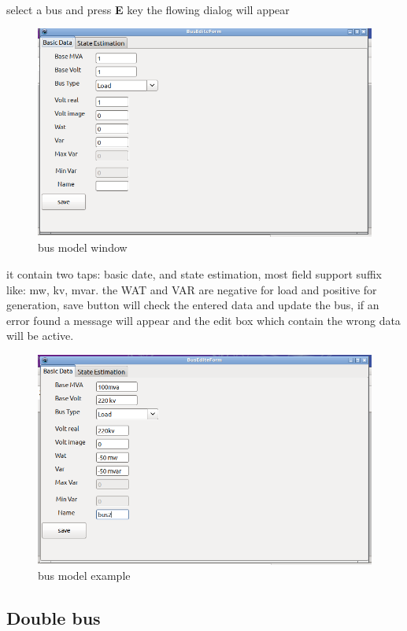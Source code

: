 \documentclass{article}
\begin{document}
\paragraph{}select a bus and press \textbf{E} key the flowing dialog will appear
\begin{figure}[H]
	\includegraphics[width=\linewidth]{busedite.png}
	\caption{bus model window}
	\label{fig:busedite}
\end{figure}
it contain two taps: basic date, and state estimation, most field support suffix like: mw, kv, mvar. the WAT and VAR are negative for load and positive for generation, save button will check the entered data and update the bus, if an error found a message will appear and the edit box which contain the wrong data will be active.
\begin{figure}[H]
	\includegraphics[width=\linewidth]{busedite2.png}
	\caption{bus model example}
	\label{fig:busediteexample}
\end{figure}
\subsection{Double bus}
\end{document}

